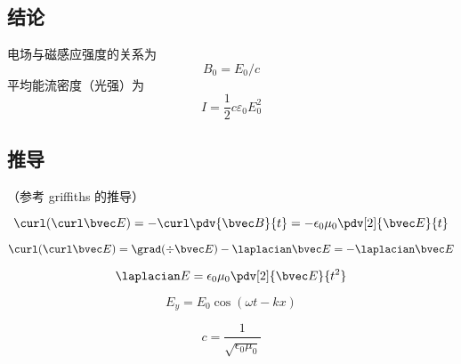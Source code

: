
\subsection{结论}
电场与磁感应强度的关系为
\begin{equation}
B_0 = E_0/c
\end{equation}
平均能流密度（光强）为
\begin{equation}
I = \frac12 c\varepsilon_0 E_0^2
\end{equation}


\subsection{推导}
（参考 griffiths 的推导）

\begin{equation}
\curl(\curl \bvec E) = -\curl\pdv{\bvec B}{t} = -\epsilon_0\mu_0 \pdv[2]{\bvec E}{t}
\end{equation}

\begin{equation}
\curl(\curl \bvec E) = \grad(\div \bvec E) - \laplacian \bvec E = - \laplacian \bvec E
\end{equation}

\begin{equation}
\laplacian E = \epsilon_0 \mu_0 \pdv[2]{\bvec E}{t^2}
\end{equation}

\begin{equation}
E_y = E_0\cos(\omega t - kx)
\end{equation}

\begin{equation}
c = \frac{1}{\sqrt{\epsilon_0\mu_0}}
\end{equation}
